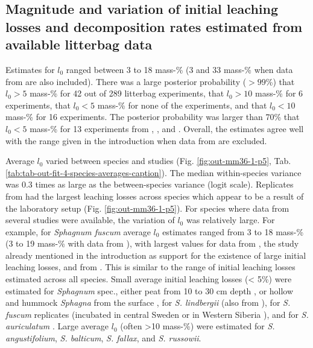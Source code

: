 \documentclass[bg, manuscript]{copernicus}
\begin{document}
\hypertarget{out-res-1}{%
\subsection{Magnitude and variation of initial leaching losses and decomposition rates estimated from available litterbag data}\label{out-res-1}}

Estimates for \(l_0\) ranged between 3 to 18 mass-\% (3 and 33 mass-\% when data from \citet{Bengtsson.2017} are also included). There was a large posterior probability (\(>99\)\%) that \(l_0>5\) mass-\% for 42 out of 289 litterbag experiments, that \(l_0>10\) mass-\% for 6 experiments, that \(l_0<5\) mass-\% for none of the experiments, and that \(l_0<10\) mass-\% for 16 experiments. The posterior probability was larger than 70\% that \(l_0<5\) mass-\% for 13 experiments from \citet{Bartsch.1985}, \citet{Prevost.1997}, and \citet{Golovatskaya.2017}. Overall, the estimates agree well with the range given in the introduction when data from \citet{Bengtsson.2017} are excluded.

Average \(l_0\) varied between species and studies (Fig. \ref{fig:out-mm36-1-p5}, Tab. \ref{tab:tab-out-fit-4-species-averages-caption}). The median within-species variance was 0.3 times as large as the between-species variance (logit scale). Replicates from \citet{Bengtsson.2017} had the largest leaching losses across species which appear to be a result of the laboratory setup (Fig. \ref{fig:out-mm36-1-p5}). For species where data from several studies were available, the variation of \(l_0\) was relatively large. For example, for \emph{Sphagnum fuscum} average \(l_0\) estimates ranged from 3 to 18 mass-\% (3 to 19 mass-\% with data from \citet{Bengtsson.2017}), with largest values for data from \citet{Thormann.2001}, the study already mentioned in the introduction as support for the existence of large initial leaching losses, and from \citet{Asada.2005b}. This is similar to the range of initial leaching losses estimated across all species. Small average initial leaching losses (\textless{} 5\%) were estimated for \emph{Sphagnum} spec., either peat from 10 to 30 cm depth \citep{Prevost.1997}, or hollow and hummock \emph{Sphagna} from the surface \citep{Bartsch.1985}, for \emph{S. lindbergii} (also from \citet{Bartsch.1985}), for \emph{S. fuscum} replicates (incubated in central Sweden \citep{Breeuwer.2008} or in Western Siberia \citep{Golovatskaya.2017}), and for \emph{S. auriculatum} \citep{Trinder.2008}. Large average \(l_0\) (often \textgreater10 mass-\%) were estimated for \emph{S. angustifolium}, \emph{S. balticum}, \emph{S. fallax}, and \emph{S. russowii}.
\end{document}
